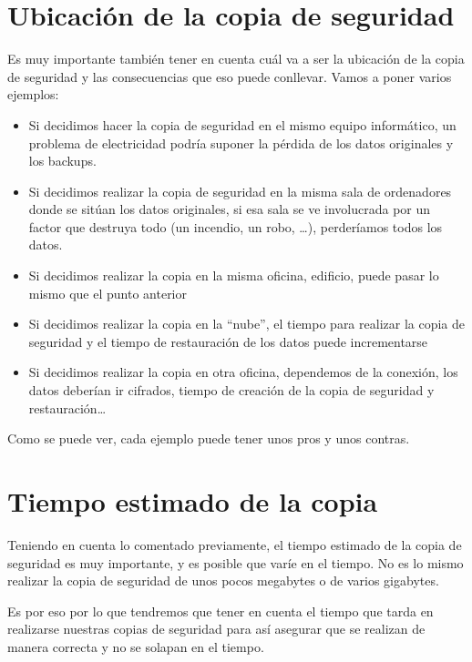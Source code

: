 \section{Ubicación de la copia de seguridad}
Es muy importante también tener en cuenta cuál va a ser la ubicación de la copia de seguridad y las consecuencias que eso puede conllevar.
 Vamos a poner varios ejemplos:

\begin{itemize}
    \item Si decidimos hacer la copia de seguridad en el mismo equipo informático, un problema de electricidad podría suponer la pérdida de los datos originales y los backups.
    \item Si decidimos realizar la copia de seguridad en la misma sala de ordenadores donde se sitúan los datos originales, si esa sala se ve involucrada por un factor que destruya todo (un incendio, un robo, …), perderíamos todos los datos.
    \item Si decidimos realizar la copia en la misma oficina, edificio, puede pasar lo mismo que el punto anterior
    \item Si decidimos realizar la copia en la “nube”, el tiempo para realizar la copia de seguridad y el tiempo de restauración de los datos puede incrementarse
    \item Si decidimos realizar la copia en otra oficina, dependemos de la conexión, los datos deberían ir cifrados, tiempo de creación de la copia de seguridad y restauración…

\end{itemize}
Como se puede ver, cada ejemplo puede tener unos pros y unos contras.


\section{Tiempo estimado de la copia}
Teniendo en cuenta lo comentado previamente, el tiempo estimado de la copia de seguridad es muy importante, y es posible que varíe en el tiempo. No es lo mismo realizar la copia de seguridad de unos pocos megabytes o de varios gigabytes.

Es por eso por lo que tendremos que tener en cuenta el tiempo que tarda en realizarse nuestras copias de seguridad para así asegurar que se realizan de manera correcta y no se solapan en el tiempo.


